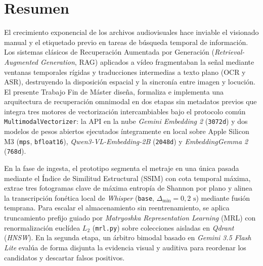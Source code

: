 \pagestyle{no-rightmark}
\thispagestyle{no-rightmark}
\section*{Resumen}

El crecimiento exponencial de los archivos audiovisuales hace inviable el visionado manual y el etiquetado previo en tareas de búsqueda temporal de información. Los sistemas clásicos de Recuperación Aumentada por Generación (\textit{Retrieval-Augmented Generation}, RAG) aplicados a vídeo fragmentaban la señal mediante ventanas temporales rígidas y traducciones intermedias a texto plano (OCR y ASR), destruyendo la disposición espacial y la sincronía entre imagen y locución. El presente Trabajo Fin de Máster diseña, formaliza e implementa una arquitectura de recuperación omnimodal en dos etapas sin metadatos previos que integra tres motores de vectorización intercambiables bajo el protocolo común \texttt{MultimodalVectorizer}: la API en la nube \textit{Gemini Embedding 2} (\texttt{3072d}) y dos modelos de pesos abiertos ejecutados íntegramente en local sobre Apple Silicon M3 (\texttt{mps}, \texttt{bfloat16}), \textit{Qwen3-VL-Embedding-2B} (\texttt{2048d}) y \textit{EmbeddingGemma 2} (\texttt{768d}).

En la fase de ingesta, el prototipo segmenta el metraje en una única pasada mediante el Índice de Similitud Estructural (SSIM) con cota temporal máxima, extrae tres fotogramas clave de máxima entropía de Shannon por plano y alinea la transcripción fonética local de \textit{Whisper} (\texttt{base}, $\Delta_{\min} = 0,2\text{ s}$) mediante fusión temprana. Para escalar el almacenamiento sin reentrenamiento, se aplica truncamiento prefijo guiado por \textit{Matryoshka Representation Learning} (MRL) con renormalización euclídea $L_2$ (\texttt{mrl.py}) sobre colecciones aisladas en \textit{Qdrant} (\textit{HNSW}). En la segunda etapa, un árbitro bimodal basado en \textit{Gemini 3.5 Flash Lite} evalúa de forma disjunta la evidencia visual y auditiva para reordenar los candidatos y descartar falsos positivos.

